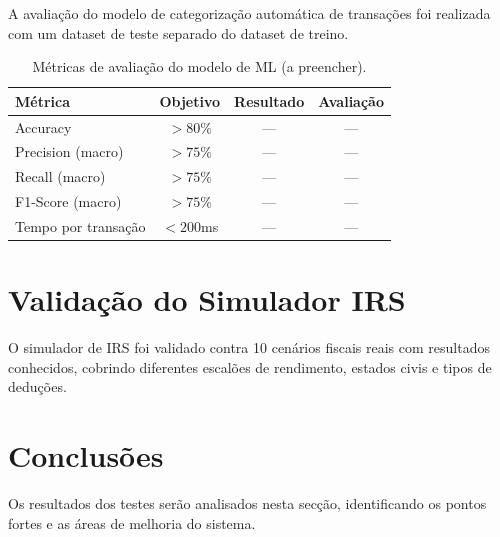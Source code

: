 A avaliação do modelo de categorização automática de transações foi realizada com um dataset de teste separado do dataset de treino.

\begin{table}[H]
\centering
\caption{Métricas de avaliação do modelo de ML (a preencher).}
\label{tab:ml-results}
\begin{tabularx}{\textwidth}{l c c c}
\toprule
\textbf{Métrica} & \textbf{Objetivo} & \textbf{Resultado} & \textbf{Avaliação} \\
\midrule
Accuracy & $> 80\%$ & --- & --- \\
Precision (macro) & $> 75\%$ & --- & --- \\
Recall (macro) & $> 75\%$ & --- & --- \\
F1-Score (macro) & $> 75\%$ & --- & --- \\
Tempo por transação & $< 200$ms & --- & --- \\
\bottomrule
\end{tabularx}
\end{table}


\section{Validação do Simulador IRS}
\label{sec:test-irs}

O simulador de \ac{IRS} foi validado contra 10 cenários fiscais reais com resultados conhecidos, cobrindo diferentes escalões de rendimento, estados civis e tipos de deduções.



\section{Conclusões}
\label{sec:test-conclusoes}

Os resultados dos testes serão analisados nesta secção, identificando os pontos fortes e as áreas de melhoria do sistema.
